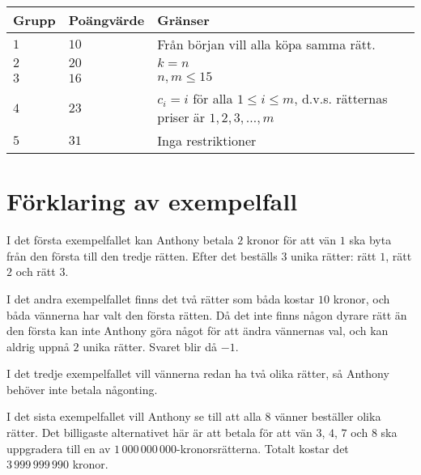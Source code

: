\noindent
\begin{tabular}{| l | l | l |}
\hline
Grupp & Poängvärde & Gränser \\ \hline
$1$    & $10$         & Från början vill alla köpa samma rätt. \\ \hline
$2$    & $20$         & $k = n$ \\ \hline
$3$    & $16$         & $n, m \le 15$ \\ \hline
$4$    & $23$         & $c_i = i$ för alla $1 \leq i \leq m$, d.v.s. rätternas priser är $1, 2, 3, \dots, m$ \\ \hline
$5$    & $31$         & Inga restriktioner \\ \hline
\end{tabular}

\section*{Förklaring av exempelfall}
I det första exempelfallet kan Anthony betala $2$ kronor för att vän $1$ ska byta från den första till den tredje rätten. Efter det beställs $3$ unika rätter: rätt $1$, rätt $2$ och rätt $3$.

I det andra exempelfallet finns det två rätter som båda kostar $10$ kronor, och båda vännerna har valt den första rätten. Då det inte finns någon dyrare rätt än den första kan inte Anthony göra något för att ändra vännernas val, och kan aldrig uppnå $2$ unika rätter. Svaret blir då $-1$.

I det tredje exempelfallet vill vännerna redan ha två olika rätter, så Anthony behöver inte betala någonting.

I det sista exempelfallet vill Anthony se till att alla $8$ vänner beställer olika rätter. Det billigaste alternativet här är att betala för att vän $3$, $4$, $7$ och $8$ ska uppgradera till en av $1\,000\,000\,000$-kronorsrätterna. Totalt kostar det $3\,999\,999\,990$ kronor.
